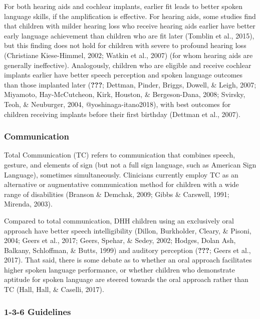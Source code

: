 \documentclass[english,man,floatsintext]{apa6}
\begin{document}
For both hearing aids and cochlear implants, earlier fit leads to better spoken language skills, if the amplification is effective. For hearing aids, some studies find that children with milder hearing loss who receive hearing aids earlier have better early language achievement than children who are fit later (Tomblin et al., 2015), but this finding does not hold for children with severe to profound hearing loss (Christiane Kiese-Himmel, 2002; Watkin et al., 2007) (for whom hearing aids are generally ineffective). Analogously, children who are eligible and receive cochlear implants earlier have better speech perception and spoken language outcomes than those implanted later ({\textbf{???}}; Dettman, Pinder, Briggs, Dowell, \& Leigh, 2007; Miyamoto, Hay-McCutcheon, Kirk, Houston, \& Bergeson-Dana, 2008; Svirsky, Teoh, \& Neuburger, 2004, @yoshinaga-itano2018), with best outcomes for children receiving implants before their first birthday (Dettman et al., 2007).

\hypertarget{communication}{%
\subsubsection{Communication}\label{communication}}

Total Communication (TC) refers to communication that combines speech, gesture, and elements of sign (but not a full sign language, such as American Sign Language), sometimes simultaneously. Clinicians currently employ TC as an alternative or augmentative communication method for children with a wide range of disabilities (Branson \& Demchak, 2009; Gibbs \& Carswell, 1991; Mirenda, 2003).

Compared to total communication, DHH children using an exclusively oral approach have better speech intelligibility (Dillon, Burkholder, Cleary, \& Pisoni, 2004; Geers et al., 2017; Geers, Spehar, \& Sedey, 2002; Hodges, Dolan Ash, Balkany, Schloffman, \& Butts, 1999) and auditory perception ({\textbf{???}}; Geers et al., 2017). That said, there is some debate as to whether an oral approach facilitates higher spoken language performance, or whether children who demonstrate aptitude for spoken language are steered towards the oral approach rather than TC (Hall, Hall, \& Caselli, 2017).

\hypertarget{guidelines}{%
\subsubsection{1-3-6 Guidelines}\label{guidelines}}
\end{document}
